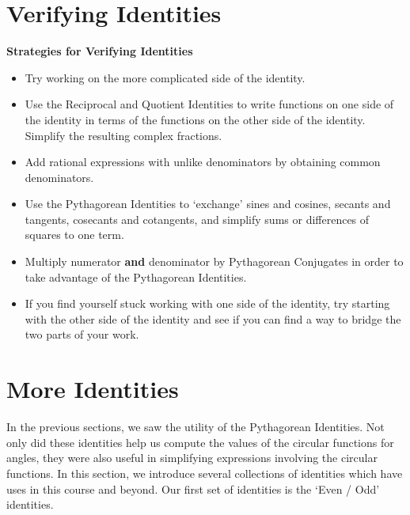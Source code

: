 \documentclass{ximera}
\begin{document}
\section{Verifying Identities}
\begin{remark}
\centerline{\textbf{Strategies for Verifying Identities}} 

\begin{itemize}

\item  Try working on the more complicated side of the identity.

\item Use the Reciprocal and Quotient Identities to write functions on one side of the identity in terms of the functions on the other side of the identity.  Simplify the resulting complex fractions.

\item Add rational expressions with unlike denominators by obtaining common denominators.

\item  Use the Pythagorean Identities to `exchange' sines and cosines, secants and tangents, cosecants and cotangents, and simplify sums or differences of squares to one term. 

\item Multiply numerator \textbf{and} denominator by Pythagorean
Conjugates in order to take advantage of the Pythagorean Identities.

\item If you find yourself stuck working with one side of the identity, try starting with the other side of the identity and see if you can find a way to bridge the two parts of your work.


\end{itemize}
\end{remark}
\begin{example}
\end{example}


\section{More Identities}
In the previous sections, we saw the utility of the Pythagorean Identities.  Not only did these identities help us compute the values of the circular functions for angles, they were also useful in simplifying expressions involving the circular functions.  In this section, we introduce several collections of identities which have uses in this course and beyond.  Our first set of identities is the `Even / Odd' identities.
\end{document}

